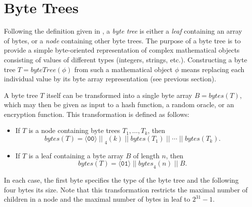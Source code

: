 \documentclass[bibtotoc,halfparskip,oneside]{scrreprt}
\newcommand{\hex}[1]{\ensuremath{\mathtt{#1}}}
\newcommand{\conc}{\ensuremath{\;||\;}}
\begin{document}
\section{Byte Trees}

Following the definition given in \cite{wikstrom12}, a \emph{byte tree} is either a \emph{leaf} containing an array of bytes, or a \emph{node} containing other byte trees. The purpose of a byte tree is to provide a simple byte-oriented representation of complex mathematical objects consisting of values of different types (integers, strings, etc.). Constructing a byte tree $T=\mathit{byteTree}(\phi)$ from such a mathematical object $\phi$ means replacing each individual value by its byte array representation (see previous section). 

A byte tree $T$ itself can be transformed into a single byte array $B=\mathit{bytes}(T)$, which may then be given as input to a hash function, a random oracle, or an encryption function. This transformation is defined as follows:
\begin{itemize}
	\item If $T$ is a node containing byte trees $T_1,\ldots,T_k$, then $$\mathit{bytes}(T)=\langle\hex{00}\rangle\conc _4(k)\conc \mathit{bytes}(T_1)\conc \cdots\conc \mathit{bytes}(T_k).$$
	\item If $T$ is a leaf containing a byte array $B$ of length $n$, then $$\mathit{bytes}(T)=\langle\hex{01}\rangle\conc \mathit{bytes}_4(n)\conc B.$$
\end{itemize}
In each case, the first byte specifies the type of the byte tree and the following four bytes its size. Note that this transformation restricts the maximal number of children in a node and the maximal number of bytes in leaf to $2^{31}-1$.
\end{document}
